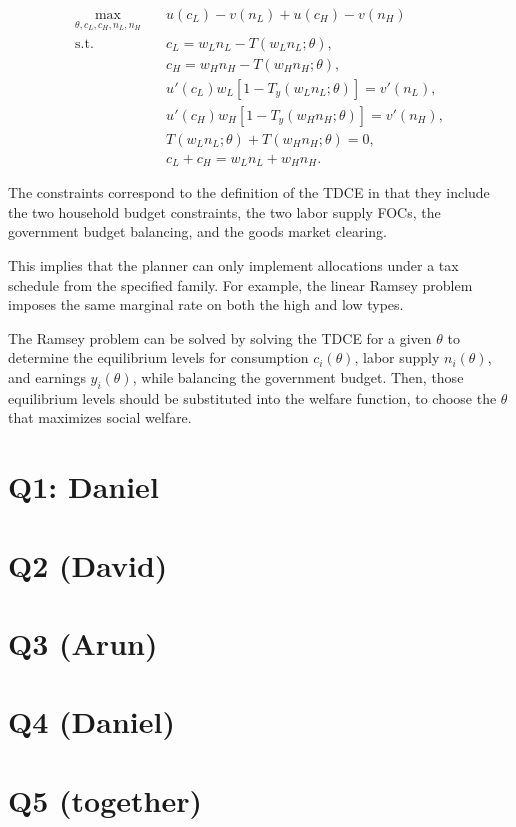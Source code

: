 \documentclass[
  letterpaper,
  DIV=11,
  numbers=noendperiod]{scrartcl}
\begin{document}
\[
\begin{aligned}
\max_{\theta,c_L,c_H,n_L,n_H}\quad
&u(c_L)-v(n_L)+u(c_H)-v(n_H)\\
\text{s.t.}\quad
&c_L=w_Ln_L-T(w_Ln_L;\theta),\\
&c_H=w_Hn_H-T(w_Hn_H;\theta),\\
&u'(c_L)w_L[1-T_y(w_Ln_L;\theta)]=v'(n_L),\\
&u'(c_H)w_H[1-T_y(w_Hn_H;\theta)]=v'(n_H),\\
&T(w_Ln_L;\theta)+T(w_Hn_H;\theta)=0,\\
&c_L+c_H=w_Ln_L+w_Hn_H.
\end{aligned}
\]

The constraints correspond to the definition of the TDCE in that they
include the two household budget constraints, the two labor supply FOCs,
the government budget balancing, and the goods market clearing.

This implies that the planner can only implement allocations under a tax
schedule from the specified family. For example, the linear Ramsey
problem imposes the same marginal rate on both the high and low types.

The Ramsey problem can be solved by solving the TDCE for a given
\(\theta\) to determine the equilibrium levels for consumption
\(c_i(\theta)\), labor supply \(n_i(\theta)\), and earnings
\(y_i(\theta)\), while balancing the government budget. Then, those
equilibrium levels should be substituted into the welfare function, to
choose the \(\theta\) that maximizes social welfare.

\breakpage

\section{Q1: Daniel}\label{q1-daniel}

\breakpage

\section{Q2 (David)}\label{q2-david}

\section{Q3 (Arun)}\label{q3-arun}

\section{Q4 (Daniel)}\label{q4-daniel}

\section{Q5 (together)}\label{q5-together}
\end{document}
